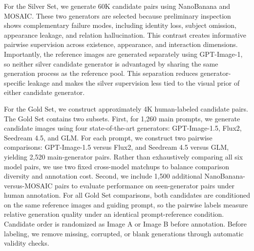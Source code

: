 For the Silver Set, we generate 60K candidate pairs using NanoBanana and MOSAIC. These two generators are selected because preliminary inspection shows complementary failure modes, including identity loss, subject omission, appearance leakage, and relation hallucination. This contrast creates informative pairwise supervision across existence, appearance, and interaction dimensions. Importantly, the reference images are generated separately using GPT-Image-1, so neither silver candidate generator is advantaged by sharing the same generation process as the reference pool. This separation reduces generator-specific leakage and makes the silver supervision less tied to the visual prior of either candidate generator.

For the Gold Set, we construct approximately 4K human-labeled candidate pairs. The Gold Set contains two subsets. First, for 1,260 main prompts, we generate candidate images using four state-of-the-art generators: GPT-Image-1.5, Flux2, Seedream 4.5, and GLM. For each prompt, we construct two pairwise comparisons: GPT-Image-1.5 versus Flux2, and Seedream 4.5 versus GLM, yielding 2,520 main-generator pairs. Rather than exhaustively comparing all six model pairs, we use two fixed cross-model matchups to balance comparison diversity and annotation cost. Second, we include 1,500 additional NanoBanana-versus-MOSAIC pairs to evaluate performance on seen-generator pairs under human annotation. For all Gold Set comparisons, both candidates are conditioned on the same reference images and guiding prompt, so the pairwise labels measure relative generation quality under an identical prompt-reference condition. Candidate order is randomized as Image A or Image B before annotation. Before labeling, we remove missing, corrupted, or blank generations through automatic validity checks.




